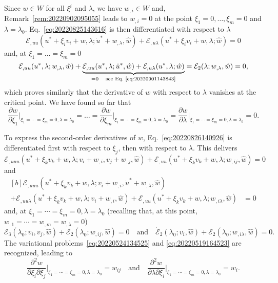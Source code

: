 \documentclass[12pt, final]{scrartcl}
\theoremstyle{definition}
\newcommand{\E}{\mathcal E}
\begin{document}
Since $w \in W$ for all $ξ^i$ and $\lambda$, we have $w_{,i} \in W$ and,
Remark~\ref{rem:20220902095055} leads to $w_{,i} = 0$ at the point
$ξ_1 = 0, \ldots, ξ_m = 0$ and $\lambda = \lambda_0$. Eq.~\eqref{eq:20220825143616} is
then differentiated with respect to  $\lambda$
\begin{equation}
  \label{eq:20220830145945}
  \E_{,uu}(u^\ast + ξ_i v_i + w, \lambda; \dot{u}^\ast + w_{,\lambda}, \hat{w}) + \E_{,u\lambda}(u^\ast + ξ_i v_i + w, \lambda; \hat{w}) = 0
\end{equation}
and, at $ξ_1 = \ldots = ξ_m = 0$
\begin{equation}
  \label{eq:20220830151513}
  \E_{,uu}(u^\ast, \lambda; w_{,\lambda}, \hat{w})
  + \underbrace{\E_{,uu}(u^\ast, \lambda; \dot{u}^\ast, \hat{w}) + \E_{,u\lambda}(u^\ast, \lambda; \hat{w})}_{=0 \quad \text{see Eq.~\eqref{eq:20220901143843}}}
  = \E_2(\lambda; w_{,\lambda}, \hat{w}) = 0,
\end{equation}
which proves similarly that the derivative of $w$ with respect to $\lambda$
vanishes at the critical point. We have found so far that
\begin{equation}
  \frac{∂w}{∂ξ_1} \biggr\rvert_{ξ_1 = \cdots = ξ_m = 0, \lambda = \lambda_0}
  = \ldots =
  \frac{∂w}{∂ξ_m} \biggr\rvert_{ξ_1 = \cdots = ξ_m = 0, \lambda = \lambda_0}
  = \frac{∂w}{∂\lambda} \biggr\rvert_{ξ_1 = \cdots = ξ_m = 0, \lambda = \lambda_0}= 0.
\end{equation}

To express the second-order derivatives of $w$, Eq.~\eqref{eq:20220826140926}
is differentiated first with respect to $ξ_j$, then with respect to
$\lambda$. This delivers
\begin{equation}
  \E_{,uuu}(u^\ast + ξ_k v_k + w, \lambda; v_i + w_{,i}, v_j + w_{,j}, \hat{w}) + \E_{,uu}(u^\ast + ξ_k v_k + w, \lambda; w_{,ij}, \hat{w}) = 0
\end{equation}
and
\begin{equation}
  \begin{aligned}[b]
    \E_{,uuu}(u^\ast + ξ_k v_k + w, \lambda; v_i + w_{,i}, \dot{u}^\ast + w_{,\lambda}, \hat{w}) &\\
    + \E_{,uu\lambda}(u^\ast + ξ_k v_k + w, \lambda; v_i + w_{,i}, \hat{w}) + \E_{,uu}(u^\ast + ξ_k v_k + w, \lambda; w_{,i\lambda}, \hat{w}) &= 0
  \end{aligned}
\end{equation}
and, at $ξ_1 = \cdots = ξ_m = 0, \lambda = \lambda_0$ (recalling that, at this point,
$w_{,1} = \cdots = w_{, m} = w_{,\lambda} = 0$)
\begin{equation}
  \E_3(\lambda_0; v_i, v_j, \hat{w}) + \E_2(\lambda_0; w_{,ij}, \hat{w}) = 0
  \quad \text{and} \quad
  \dot{\E}_2(\lambda_0; v_i, \hat{w}) + \E_2(\lambda_0; w_{,i\lambda}, \hat{w}) = 0.
\end{equation}
The variational problems~\eqref{eq:20220524134525} and \eqref{eq:20220519164523}
are recognized, leading to
\begin{equation}
  \frac{∂^2w}{∂ξ_i ∂ξ_j}\biggr\rvert_{ξ_1 = \cdots = ξ_m = 0, \lambda = \lambda_0} = w_{ij}
  \quad\text{and}\quad
  \frac{∂^2w}{∂\lambda ∂ξ_i}\biggr\rvert_{ξ_1 = \cdots = ξ_m = 0, \lambda = \lambda_0} = w_{i}.
\end{equation}
\end{document}
